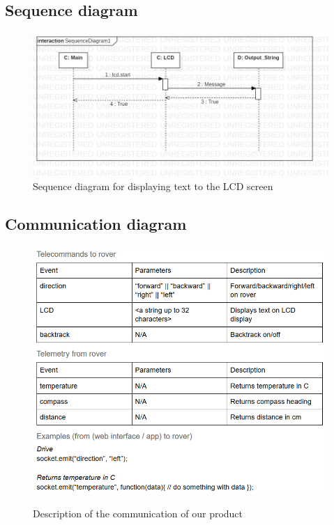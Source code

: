 \documentclass[12pt]{article}
\begin{document}
 	\subsection{Sequence diagram}
 	\begin{figure}[H]
 		\includegraphics[width=\linewidth]{SequenceDiagram1.png}
 		\caption{Sequence diagram for displaying text to the LCD screen}
 	\end{figure}
 	\subsection{Communication diagram}
 	\begin{figure}[H]
 		\centering
 		\includegraphics[width=\linewidth]{ComDiagram.png}\\
 		\caption{Description of the communication of our product}
 	\end{figure}
\end{document}
